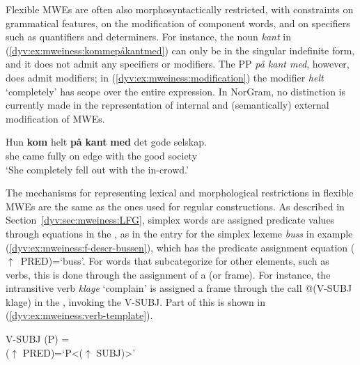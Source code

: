 \documentclass[output=paper]{langsci/langscibook}
\begin{document}
Flexible MWEs are often also morphosyntactically restricted, with constraints on grammatical features, on the modification of component words, and on specifiers such as quantifiers and determiners.
For instance, the noun \emph{kant} in (\ref{dyv:ex:mweiness:kommepåkantmed}) can only be in the singular indefinite form, and it does not admit any specifiers or modifiers.
The PP \emph{på kant med}, however, does admit modifiers; in (\ref{dyv:ex:mweiness:modification}) the modifier \emph{helt} `completely' has scope over the entire expression.
In NorGram, no distinction is currently made in the representation of internal and (semantically) external modification of MWEs. 

\ea\label{dyv:ex:mweiness:modification}
\gll Hun \textbf{kom} helt \textbf{på} \textbf{kant} \textbf{med} det gode selskap. \\
she came fully on edge with the good society \\
\glt `She completely fell out with the in-crowd.' \\
\z

The mechanisms for representing lexical and morphological restrictions in flexible MWEs are the same as the ones used for regular constructions.
As described in Section~\ref{dyv:sec:mweiness:LFG}, simplex words are assigned predicate values through equations in the , as in the entry for the simplex lexeme \emph{buss} in example (\ref{dyv:ex:mweiness:f-descr-bussen}), which has the predicate assignment equation ($\uparrow$~PRED)=`buss'. 
For words that subcategorize for other elements, such as verbs, this is done through the assignment of a  (or  frame). 
For instance, the intransitive verb \emph{klage} `complain' is assigned a frame through the  call @(V-SUBJ klage) in the , invoking the  V-SUBJ. 
Part of this  is shown in (\ref{dyv:ex:mweiness:verb-template}).

\ea\label{dyv:ex:mweiness:verb-template}
{\small 
 V-SUBJ (P) = \\
\hspace{2em} ($\uparrow$ PRED)=`P<($\uparrow$ SUBJ)>' \\
}
\z
\end{document}

